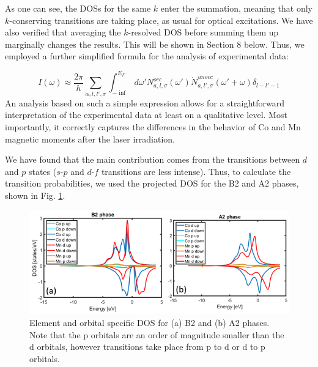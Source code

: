 As one can see, the DOSs for the same $k$ enter the summation, meaning that only $k$-conserving transitions are taking place, as usual for optical excitations. We have also verified that averaging the $k$-resolved DOS before summing them up marginally changes the results. This will be shown in Section 8 below. Thus, we employed a further simplified formula for the analysis of experimental data:

\begin{equation}
I(\omega)\approx\frac{2\pi}{h}\sum_{\alpha,l,l',\sigma}\int^{E_F}_{-\inf}d\omega'N^{occ}_{a,l,\sigma}(\omega')\dot N^{unocc}_{a,l',\sigma}(\omega'+\omega)\delta_{l-l'-1}
\label{eqn:HeuslerS5}
\end{equation}
An analysis based on such a simple expression allows for a straightforward interpretation of the experimental data at least on a qualitative level. Most importantly, it correctly captures the differences in the behavior of Co and Mn magnetic moments after the laser irradiation.

We have found that the main contribution comes from the transitions between $d$ and $p$ states ($s$-$p$ and $d$-$f$  transitions are less intense). Thus, to calculate the transition probabilities, we used the projected DOS for the B2 and A2 phases, shown in Fig. \ref{fig: elementOrbitalDOS}.

\begin{figure}[htbp]
	\begin{center}
		\includegraphics[width=150mm]{figs/ElementOrbitalDOS}
	\end{center}
	\caption{Element and orbital specific DOS for (a) B2 and (b) A2 phases. Note that the p orbitals are an order of magnitude smaller than the d orbitals, however transitions take place from p to d or d to p orbitals.}
	\label{fig: elementOrbitalDOS}
\end{figure}


